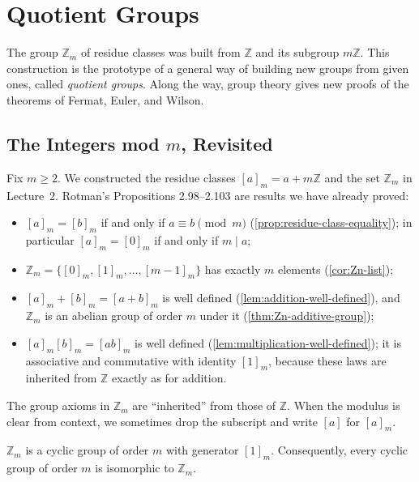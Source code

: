 
\section{Quotient Groups}

The group \(\mathbb Z_m\) of residue classes was built from \(\mathbb Z\) and its subgroup
\(m\mathbb Z\). This construction is the prototype of a general way of building new groups
from given ones, called \emph{quotient groups}. Along the way, group theory gives new proofs
of the theorems of Fermat, Euler, and Wilson.

\subsection{The Integers mod \(m\), Revisited}

Fix \(m \geq 2\). We constructed the residue classes \([a]_m = a + m\mathbb Z\) and the set
\(\mathbb Z_m\) in Lecture~2. Rotman's Propositions 2.98--2.103 are results we have
already proved:
\begin{itemize}
	\item \([a]_m = [b]_m\) if and only if \(a \equiv b \pmod m\)
	      (\autoref{prop:residue-class-equality}); in particular \([a]_m = [0]_m\) if and only
	      if \(m \mid a\);
	\item \(\mathbb Z_m = \{[0]_m, [1]_m, \dots, [m-1]_m\}\) has exactly \(m\) elements
	      (\autoref{cor:Zn-list});
	\item \([a]_m + [b]_m = [a+b]_m\) is well defined (\autoref{lem:addition-well-defined}),
	      and \(\mathbb Z_m\) is an abelian group of order \(m\) under it
	      (\autoref{thm:Zn-additive-group});
	\item \([a]_m[b]_m = [ab]_m\) is well defined (\autoref{lem:multiplication-well-defined});
	      it is associative and commutative with identity \([1]_m\), because these laws are
	      inherited from \(\mathbb Z\) exactly as for addition.
\end{itemize}
The group axioms in \(\mathbb Z_m\) are ``inherited'' from those of \(\mathbb Z\). When the
modulus is clear from context, we sometimes drop the subscript and write \([a]\) for
\([a]_m\).

\begin{proposition}\label{prop:Zm-cyclic}
	\(\mathbb Z_m\) is a cyclic group of order \(m\) with generator \([1]_m\). Consequently,
	every cyclic group of order \(m\) is isomorphic to \(\mathbb Z_m\).
\end{proposition}

